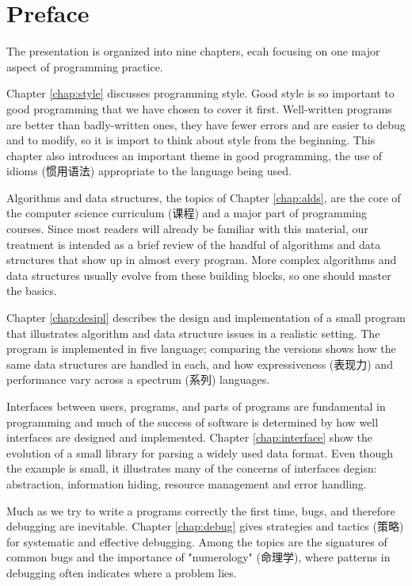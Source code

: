 
\chapter{Preface}
The presentation is organized into nine chapters, ecah focusing on one
major aspect of programming practice.

Chapter \ref{chap:style} discusses programming style. Good style is so
important to good programming that we have chosen to cover it first.
Well-written programs are better than badly-written ones, they have fewer
errors and are easier to debug and to modify, so it is import to think
about style from the beginning. This chapter also introduces an important
theme in good programming, the use of idioms (惯用语法) appropriate to the
language being used.

Algorithms and data structures, the topics of Chapter \ref{chap:alds}, are
the core of the computer science curriculum (课程) and a major part of
programming courses. Since most readers will already be familiar with this
material, our treatment is intended as a brief review of the handful of
algorithms and data structures that show up in almost every program. More
complex algorithms and data structures usually evolve from these building
blocks, so one should master the basics.

Chapter \ref{chap:desipl} describes the design and implementation of a
small program that illustrates algorithm and data structure issues in a
realistic setting. The program is implemented in five language; comparing
the versions shows how the same data structures are handled in each, and
how expressiveness (表现力) and performance vary across a spectrum (系列)
languages.

Interfaces between users, programs, and parts of programs are fundamental
in programming and much of the success of software is determined by how
well interfaces are designed and implemented. Chapter \ref{chap:interface}
show the evolution of a small library for parsing a widely used data
format. Even though the example is small, it illustrates many of the
concerns of interfaces degisn: abstraction, information hiding, resource
management and error handling.

Much as we try to write a programs correctly the first time, bugs, and
therefore debugging are inevitable. Chapter \ref{chap:debug} gives
strategies and tactics (策略) for systematic and effective debugging. Among
the topics are the signatures of common bugs and the importance of
"numerology" (命理学), where patterns in debugging often indicates where a
problem lies.

